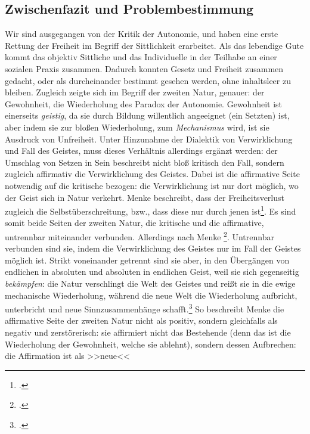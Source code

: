 \documentclass[12pt, a4paper, openany]{report}
\begin{document}
\subsection{Zwischenfazit und Problembestimmung}\label{zwisschenfazit}
Wir sind ausgegangen von der Kritik der Autonomie, und haben eine erste Rettung der Freiheit im Begriff der Sittlichkeit erarbeitet. 
Als das lebendige Gute kommt das objektiv Sittliche und das Individuelle in der Teilhabe an einer sozialen Praxis zusammen. 
Dadurch konnten Gesetz und Freiheit zusammen gedacht, oder als durcheinander bestimmt gesehen werden, ohne inhaltsleer zu bleiben.
Zugleich zeigte sich im Begriff der zweiten Natur, genauer: der Gewohnheit, die Wiederholung des Paradox der Autonomie.
Gewohnheit ist einerseits \emph{geistig}, da sie durch Bildung willentlich angeeignet (ein Setzten) ist, aber indem sie zur bloßen Wiederholung, zum \emph{Mechanismus} wird, ist sie  Ausdruck von Unfreiheit.
Unter Hinzunahme der Dialektik von Verwirklichung und Fall des Geistes, muss dieses Verhältnis allerdings ergänzt werden:
der Umschlag von Setzen in Sein beschreibt nicht bloß kritisch den Fall, sondern zugleich affirmativ die Verwirklichung des Geistes.
Dabei ist die affirmative Seite notwendig auf die kritische bezogen: 
die Verwirklichung ist nur dort möglich, wo der Geist sich in Natur verkehrt.
Menke beschreibt, dass der Freiheitsverlust zugleich die Selbstüberschreitung, bzw., dass diese nur durch jenen ist\footcite[Vgl.][145]{menke_autonomie_2018}.
Es sind somit beide Seiten der zweiten Natur, die kritische und die affirmative, untrennbar miteinander verbunden.
Allerdings nach Menke \footcite[][147]{menke_autonomie_2018}.
Untrennbar verbunden sind sie, indem die Verwirklichung des Geistes nur im Fall der Geistes möglich ist.
Strikt voneinander getrennt sind sie aber, in den Übergängen von endlichen in absoluten und absoluten in endlichen Geist, weil sie sich gegenseitig \emph{bekämpfen}:
die Natur verschlingt die Welt des Geistes und reißt sie in die ewige mechanische Wiederholung, während die neue Welt die Wiederholung aufbricht, unterbricht und neue Sinnzusammenhänge schafft.\footcite[Vgl.][147]{menke_autonomie_2018}
So beschreibt Menke die affirmative Seite der zweiten Natur nicht als positiv, sondern gleichfalls als negativ und zerstörerisch:
sie affirmiert nicht das Bestehende (denn das ist die Wiederholung der Gewohnheit, welche sie ablehnt), sondern dessen Aufbrechen: 
die Affirmation ist als >>neue<< %
\end{document}
